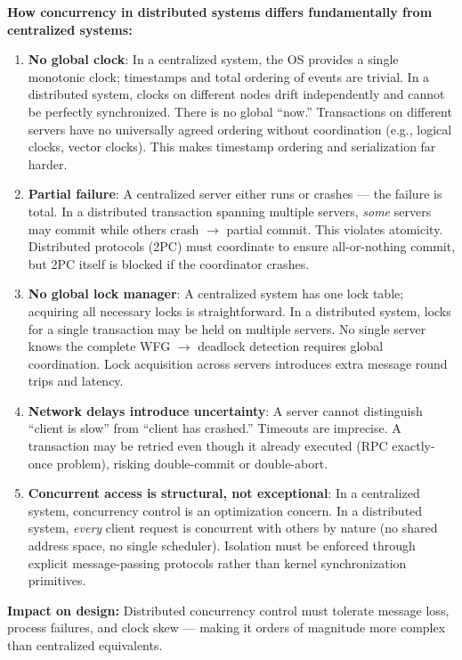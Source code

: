 \documentclass[11pt,a4paper]{article}
\newcommand{\key}[1]{\textbf{\textcolor{keyred}{#1}}}
\begin{document}
\begin{answerbox}
\textbf{How concurrency in distributed systems differs fundamentally from centralized systems:}

\begin{enumerate}
  \item \key{No global clock}: In a centralized system, the OS provides a single monotonic clock; timestamps and total ordering of events are trivial. In a distributed system, clocks on different nodes drift independently and cannot be perfectly synchronized. There is no global ``now.'' Transactions on different servers have no universally agreed ordering without coordination (e.g., logical clocks, vector clocks). This makes timestamp ordering and serialization far harder.

  \item \key{Partial failure}: A centralized server either runs or crashes --- the failure is total. In a distributed transaction spanning multiple servers, \emph{some} servers may commit while others crash $\to$ partial commit. This violates atomicity. Distributed protocols (2PC) must coordinate to ensure all-or-nothing commit, but 2PC itself is blocked if the coordinator crashes.

  \item \key{No global lock manager}: A centralized system has one lock table; acquiring all necessary locks is straightforward. In a distributed system, locks for a single transaction may be held on multiple servers. No single server knows the complete WFG $\to$ deadlock detection requires global coordination. Lock acquisition across servers introduces extra message round trips and latency.

  \item \key{Network delays introduce uncertainty}: A server cannot distinguish ``client is slow'' from ``client has crashed.'' Timeouts are imprecise. A transaction may be retried even though it already executed (RPC exactly-once problem), risking double-commit or double-abort.

  \item \key{Concurrent access is structural, not exceptional}: In a centralized system, concurrency control is an optimization concern. In a distributed system, \emph{every} client request is concurrent with others by nature (no shared address space, no single scheduler). Isolation must be enforced through explicit message-passing protocols rather than kernel synchronization primitives.
\end{enumerate}

\textbf{Impact on design:} Distributed concurrency control must tolerate message loss, process failures, and clock skew --- making it orders of magnitude more complex than centralized equivalents.
\end{answerbox}
\end{document}
